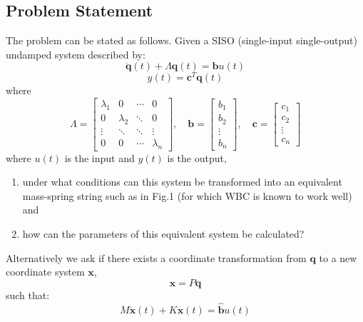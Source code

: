 \documentclass{mbd_fullpaper}
\begin{document}
\subsection*{Problem Statement}
The problem can be stated as follows. Given a SISO (single-input single-output) undamped system described by:
\begin{equation}
\ddot{\mathbf{q}}(t) + \Lambda\mathbf{q}(t) = \mathbf{b}u(t)
\label{eq:modal1}
\end{equation}
\begin{equation}
y(t) = \mathbf{c}^T \mathbf{q}(t)
\label{eq:modal2}
\end{equation}
where
\begin{equation}
\Lambda = \begin{bmatrix}
\lambda_1  &  0 & \cdots & 0 \\
0 & \lambda_2  & \ddots & 0 \\
\vdots & \ddots & \ddots & \vdots \\
0 & 0 & \cdots & \lambda_n \end{bmatrix}
,\quad \mathbf{b} = \begin{bmatrix} b_1 \\ b_2 \\ \vdots \\ b_n \end{bmatrix}
,\quad \mathbf{c} = \begin{bmatrix} c_1 \\ c_2 \\ \vdots \\ c_n \end{bmatrix}
\label{eq:modal3}
\end{equation}
where $u(t)$ is the input and $y(t)$ is the output,
\begin{enumerate}
\item under what conditions can this system be transformed into an equivalent mass-spring string such as in Fig.1 (for which WBC is known to work well) and
\item how can the parameters of this equivalent system be calculated?
\end{enumerate}
Alternatively we ask if there exists a coordinate transformation from $\mathbf{q}$ to a new coordinate system $\mathbf{x}$,
\begin{equation}
\mathbf{x} = P \mathbf{q}
\label{eq:transform}
\end{equation}
such that:
\begin{equation}
M\ddot{\mathbf{x}}(t) + K\mathbf{x}(t) = \mathbf{\hat{b}}u(t)
\label{eq:ms1}
\end{equation}
\end{document}
